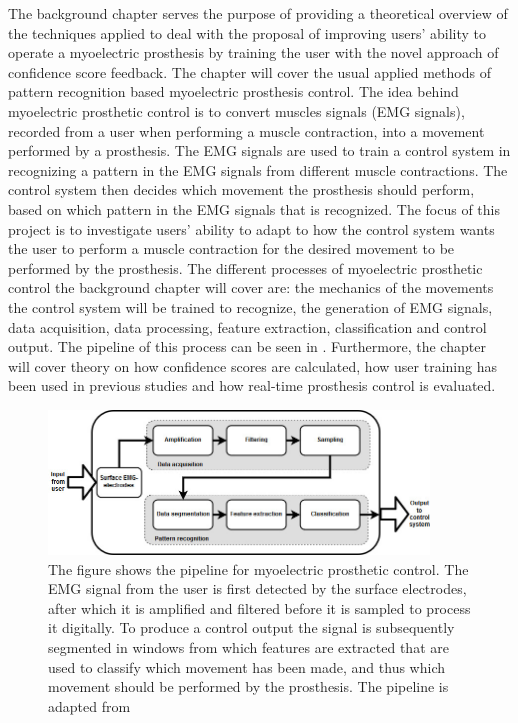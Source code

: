 The background chapter serves the purpose of providing a theoretical overview of the techniques applied to deal with the proposal of improving users' ability to operate a myoelectric prosthesis by training the user with the novel approach of confidence score feedback. The chapter will cover the usual applied methods of pattern recognition based myoelectric prosthesis control. The idea behind myoelectric prosthetic control is to  convert muscles signals (EMG signals), recorded from a user when performing a muscle contraction, into a movement performed by a prosthesis. The EMG signals are used to train a control system in recognizing a pattern in the EMG signals from different muscle contractions. The control system then decides which movement the prosthesis should perform, based on which pattern in the EMG signals that is recognized. The focus of this project is to investigate users' ability to adapt to how the control system wants the user to perform a muscle contraction for the desired movement to be performed by the prosthesis. The different processes of myoelectric prosthetic control the background chapter will cover are: the mechanics of the movements the control system will be trained to recognize, the generation of EMG signals, data acquisition, data processing, feature extraction, classification and control output. The pipeline of this process can be seen in . Furthermore, the chapter will cover theory on how confidence scores are calculated, how user training has been used in previous studies and how real-time prosthesis control is evaluated.

\begin{figure}[H] 
	\includegraphics[width=0.9\textwidth]{figures/xBackground/prosthesis_control_pipeline}
	\caption{The figure shows the pipeline for myoelectric prosthetic control. The EMG signal from the user is first detected by the surface electrodes, after which it is amplified and filtered before it is sampled to process it digitally. To produce a control output the signal is subsequently segmented in windows from which features are extracted that are used to classify which movement has been made, and thus which movement should be performed by the prosthesis. The pipeline is adapted from \cite{Peerdeman2011}}
	\label{fig:prothesis_control_pipeline}
\end{figure}